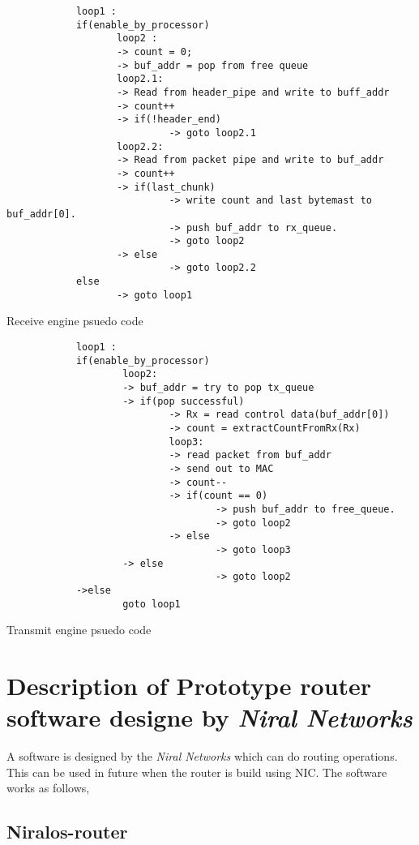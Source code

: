 \begin{appendices}
	
	\begin{algorithm}
		\centering
		\begin{verbatim}
			loop1 :
			if(enable_by_processor)
			       loop2 :
			       -> count = 0;
			       -> buf_addr = pop from free queue
			       loop2.1:
			       -> Read from header_pipe and write to buff_addr
			       -> count++
			       -> if(!header_end)
			       	        -> goto loop2.1
			       loop2.2:
			       -> Read from packet pipe and write to buf_addr 
			       -> count++
			       -> if(last_chunk)
			       	        -> write count and last bytemast to buf_addr[0].
			       	        -> push buf_addr to rx_queue.
			                -> goto loop2
			       -> else
			       	        -> goto loop2.2
			else
			       -> goto loop1
		\end{verbatim}
		\caption{Receive engine psuedo code}
		\label{alg:RecEngine}
	\end{algorithm}

\begin{algorithm}
		\centering
		\begin{verbatim}
			loop1 : 
			if(enable_by_processor)
			        loop2:
			        -> buf_addr = try to pop tx_queue
			        -> if(pop successful)
			                -> Rx = read control data(buf_addr[0]) 
			                -> count = extractCountFromRx(Rx)
			                loop3:
			                -> read packet from buf_addr
			                -> send out to MAC
			                -> count--
			                -> if(count == 0)
			                        -> push buf_addr to free_queue.
			                        -> goto loop2 
			                -> else
			                        -> goto loop3
			        -> else
			                        -> goto loop2
			->else
			        goto loop1
		\end{verbatim}
		\caption{Transmit engine psuedo code}
		\label{alg:TxEngine}
	\end{algorithm}

\chapter{Description of Prototype router software designe by \textit{Niral Networks}}

	A software is designed by the \textit{Niral Networks} which can do routing operations.
	This can be used in future when the router is build using NIC. The software works as follows,
	
	\section{Niralos-router}
	

\end{appendices}
